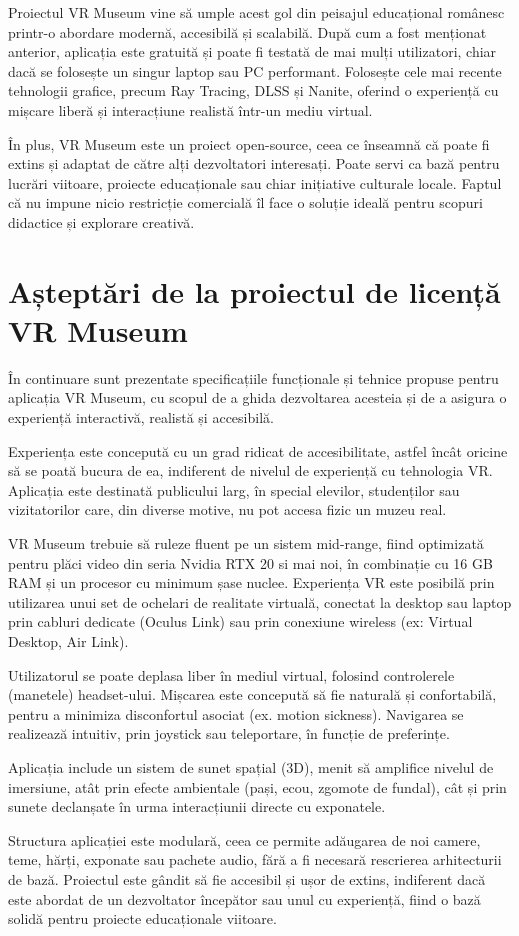 Proiectul VR Museum vine să umple acest gol din peisajul educațional românesc printr-o abordare modernă, accesibilă și scalabilă. După cum a fost menționat anterior, aplicația este gratuită și poate fi testată de mai mulți utilizatori, chiar dacă se folosește un singur laptop sau PC performant. Folosește cele mai recente tehnologii grafice, precum Ray Tracing, DLSS și Nanite, oferind o experiență cu mișcare liberă și interacțiune realistă într-un mediu virtual.

În plus, VR Museum este un proiect open-source, ceea ce înseamnă că poate fi extins și adaptat de către alți dezvoltatori interesați. Poate servi ca bază pentru lucrări viitoare, proiecte educaționale sau chiar inițiative culturale locale. Faptul că nu impune nicio restricție comercială îl face o soluție ideală pentru scopuri didactice și explorare creativă.

\section{Așteptări de la proiectul de licență VR Museum}

În continuare sunt prezentate specificațiile funcționale și tehnice propuse pentru aplicația VR Museum, cu scopul de a ghida dezvoltarea acesteia și de a asigura o experiență interactivă, realistă și accesibilă.

Experiența este concepută cu un grad ridicat de accesibilitate, astfel încât oricine să se poată bucura de ea, indiferent de nivelul de experiență cu tehnologia VR. Aplicația este destinată publicului larg, în special elevilor, studenților sau vizitatorilor care, din diverse motive, nu pot accesa fizic un muzeu real.

VR Museum trebuie să ruleze fluent pe un sistem mid-range, fiind optimizată pentru plăci video din seria Nvidia RTX 20 si mai noi, în combinație cu 16 GB RAM și un procesor cu minimum șase nuclee. Experiența VR este posibilă prin utilizarea unui set de ochelari de realitate virtuală, conectat la desktop sau laptop prin cabluri dedicate (Oculus Link) sau prin conexiune wireless (ex: Virtual Desktop, Air Link).

Utilizatorul se poate deplasa liber în mediul virtual, folosind controlerele (manetele) headset-ului. Mișcarea este concepută să fie naturală și confortabilă, pentru a minimiza disconfortul asociat (ex. motion sickness). Navigarea se realizează intuitiv, prin joystick sau teleportare, în funcție de preferințe.

Aplicația include un sistem de sunet spațial (3D), menit să amplifice nivelul de imersiune, atât prin efecte ambientale (pași, ecou, zgomote de fundal), cât și prin sunete declanșate în urma interacțiunii directe cu exponatele.

Structura aplicației este modulară, ceea ce permite adăugarea de noi camere, teme, hărți, exponate sau pachete audio, fără a fi necesară rescrierea arhitecturii de bază. Proiectul este gândit să fie accesibil și ușor de extins, indiferent dacă este abordat de un dezvoltator începător sau unul cu experiență, fiind o bază solidă pentru proiecte educaționale viitoare.